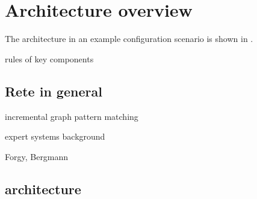 \section{Architecture overview}
\label{sec:architecture}

The \iqd{} architecture in an example configuration scenario is shown in .

rules of key components

\subsection{Rete in general}
\label{subsec:rete}

incremental graph pattern matching

expert systems background

Forgy, Bergmann

\subsection{\iqd{} architecture}



